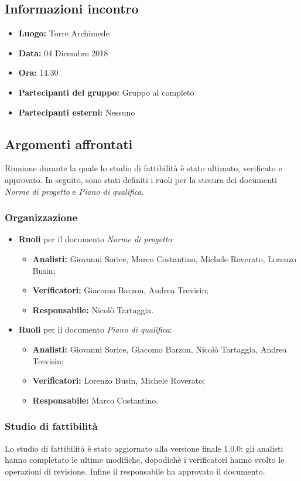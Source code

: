 \subsection{Informazioni incontro}
\begin{itemize}
	\item { \textbf{Luogo:} Torre Archimede  }
	\item { \textbf{Data:} 04 Dicembre 2018 }
	\item { \textbf{Ora:} 14.30 }
	\item { \textbf{Partecipanti del gruppo:} Gruppo al completo }
	\item { \textbf{Partecipanti esterni:} Nessuno }
\end{itemize}


\subsection{Argomenti affrontati}
Riunione durante la quale lo studio di fattibilità è stato ultimato, verificato e approvato. In seguito, sono stati definiti i ruoli per la stesura dei documenti \emph{Norme di progetto} e \emph{Piano di qualifica}.

\subsubsection{Organizzazione}
\begin{itemize}
	\item { \textbf{Ruoli} per il documento \emph{Norme di progetto}:} 
	\begin{itemize}
		\item { \textbf{Analisti:} Giovanni Sorice, Marco Costantino, Michele Roverato, Lorenzo Busin;}
		\item { \textbf{Verificatori:} Giacomo Barzon, Andrea Trevisin;}
		\item { \textbf{Responsabile:} Nicolò Tartaggia.} \\
	\end{itemize}
	\item { \textbf{Ruoli} per il documento \emph{Piano di qualifica}:} 
	\begin{itemize}
		\item { \textbf{Analisti:} Giovanni Sorice, Giacomo Barzon, Nicolò Tartaggia, Andrea Trevisin;}
		\item { \textbf{Verificatori:} Lorenzo Busin, Michele Roverato;}
		\item { \textbf{Responsabile:} Marco Costantino.}
	\end{itemize}
\end{itemize}

\subsubsection{Studio di fattibilità}
Lo studio di fattibilità è stato aggiornato alla versione finale 1.0.0: gli analisti hanno completato le ultime modifiche, dopodichè i verificatori hanno svolto le operazioni di revisione. Infine il responsabile ha approvato il documento.
